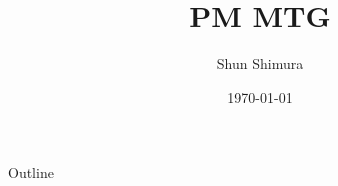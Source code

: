 \documentclass[dvipdfmx, 10pt]{beamer}
\title[]{PM MTG}
\author[]{Shun Shimura}
\date[]{\today}
\institute[]{Nagoya Graduate School of Engineering \\ Takeuchi Laboratory}
\begin{document}
        \begin{frame}
            \maketitle
            \thispagestyle{empty}%
            \addtocounter{framenumber}{-1}%
        \end{frame}

        \begin{frame}{Outline}
            \tableofcontents
        \end{frame}
        
        
        
        
        

    
\end{document}

